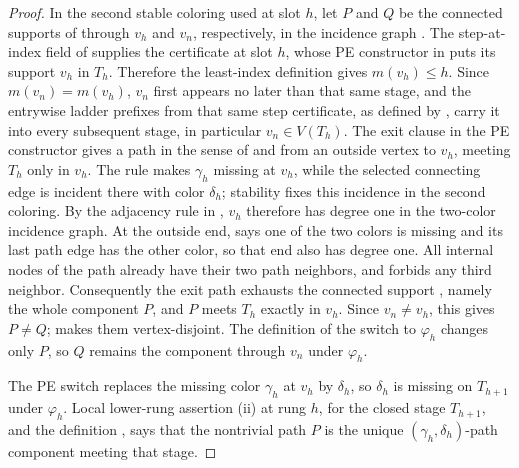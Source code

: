 \begin{proof}
In the second stable coloring used at slot \(h\), let \(P\) and \(Q\) be the
connected supports of  through \(v_h\) and
\(v_n\), respectively, in the incidence graph
.  The step-at-index field of
 supplies the certificate at slot \(h\), whose PE
constructor in  puts its support \(v_h\) in
\(T_h\).
Therefore the least-index definition
 gives \(m(v_h)\leq h\).  Since
\(m(v_n)=m(v_h)\), \(v_n\) first appears no later than that same stage, and
the entrywise ladder prefixes from that same step certificate, as defined
by , carry it into every subsequent
stage, in particular
\(v_n\in V(T_h)\).  The exit clause in the PE
constructor gives a path in the sense of  and
 from an outside vertex to \(v_h\), meeting \(T_h\)
only in \(v_h\).  The rule  makes
\(\gamma_h\) missing at \(v_h\), while the selected connecting edge is
incident there with color \(\delta_h\); stability fixes this incidence in
the second coloring.  By the adjacency rule in
, \(v_h\) therefore has degree one in the
two-color incidence graph.  At the outside end,  says one of
the two colors is missing and its last path edge has the other color, so
that end also has degree one.  All internal nodes of the path already have
their two path neighbors, and
 forbids any third neighbor.
Consequently the exit path exhausts the connected support
, namely the whole component \(P\), and \(P\)
meets \(T_h\) exactly in \(v_h\).  Since \(v_n\ne v_h\), this gives \(P\ne Q\);
 makes them vertex-disjoint.  The
definition  of the switch to
\(\varphi_h\) changes only \(P\), so \(Q\) remains the component through
\(v_n\) under \(\varphi_h\).

The PE switch replaces the missing color \(\gamma_h\) at \(v_h\) by
\(\delta_h\), so \(\delta_h\) is missing on \(T_{h+1}\) under
\(\varphi_h\).  Local lower-rung assertion (ii) at rung \(h\), for the
closed stage \(T_{h+1}\), and the definition
, says that the nontrivial path \(P\) is the
unique \((\gamma_h,\delta_h)\)-path component meeting that stage.


\end{proof}
